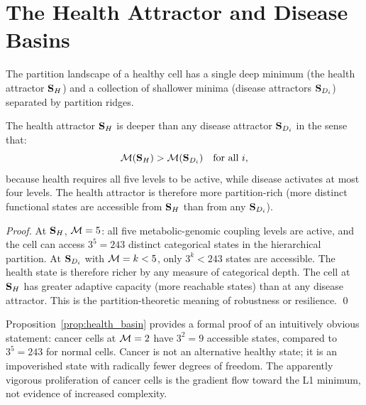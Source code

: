 \section{The Health Attractor and Disease Basins}
\label{sec:health_attractor}

The partition landscape of a healthy cell has a single deep minimum (the
health attractor $\mathbf{S}_H$) and a collection of shallower minima (disease
attractors $\mathbf{S}_{D_i}$) separated by partition ridges.

\begin{proposition}
\label{prop:health_basin}
The health attractor $\mathbf{S}_H$ is deeper than any disease attractor
$\mathbf{S}_{D_i}$ in the sense that:
\begin{equation}
  \mathcal{M}(\mathbf{S}_H) > \mathcal{M}(\mathbf{S}_{D_i}) \quad \text{for all } i,
\end{equation}
because health requires all five levels to be active, while disease activates
at most four levels. The health attractor is therefore more partition-rich
(more distinct functional states are accessible from $\mathbf{S}_H$ than from
any $\mathbf{S}_{D_i}$).
\end{proposition}

\begin{proof}
At $\mathbf{S}_H$, $\mathcal{M} = 5$: all five metabolic-genomic coupling levels are
active, and the cell can access $3^5 = 243$ distinct categorical states in the
hierarchical partition. At $\mathbf{S}_{D_i}$ with $\mathcal{M} = k < 5$, only
$3^k < 243$ states are accessible. The health state is therefore richer by
any measure of categorical depth. The cell at $\mathbf{S}_H$ has greater
adaptive capacity (more reachable states) than at any disease attractor.
This is the partition-theoretic meaning of robustness or resilience. \qed
\end{proof}

\begin{remark}
Proposition~\ref{prop:health_basin} provides a formal proof of an intuitively
obvious statement: cancer cells at $\mathcal{M} = 2$ have $3^2 = 9$ accessible
states, compared to $3^5 = 243$ for normal cells. Cancer is not an
alternative healthy state; it is an impoverished state with radically fewer
degrees of freedom. The apparently vigorous proliferation of cancer cells is
the gradient flow toward the L1 minimum, not evidence of increased complexity.
\end{remark}

